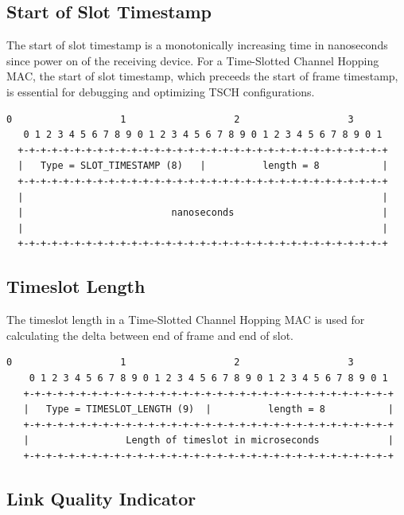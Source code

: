 \documentclass[12pt]{article}
\renewcommand\_{\textunderscore\allowbreak}
\begin{document}
\subsection{Start of Slot Timestamp}

The start of slot timestamp is a monotonically increasing time in nanoseconds
since power on of the receiving device.  For a Time-Slotted Channel Hopping
MAC, the start of slot timestamp, which preceeds the start of frame timestamp,
is essential for debugging and optimizing TSCH configurations.

\begin{Verbatim}[samepage=true]
   0                   1                   2                   3
   0 1 2 3 4 5 6 7 8 9 0 1 2 3 4 5 6 7 8 9 0 1 2 3 4 5 6 7 8 9 0 1
  +-+-+-+-+-+-+-+-+-+-+-+-+-+-+-+-+-+-+-+-+-+-+-+-+-+-+-+-+-+-+-+-+
  |   Type = SLOT_TIMESTAMP (8)   |          length = 8           |
  +-+-+-+-+-+-+-+-+-+-+-+-+-+-+-+-+-+-+-+-+-+-+-+-+-+-+-+-+-+-+-+-+
  |                                                               |
  |                          nanoseconds                          |
  |                                                               |
  +-+-+-+-+-+-+-+-+-+-+-+-+-+-+-+-+-+-+-+-+-+-+-+-+-+-+-+-+-+-+-+-+
\end{Verbatim}

\subsection{Timeslot Length}

The timeslot length in a Time-Slotted Channel Hopping MAC is used for
calculating the delta between end of frame and end of slot.

\begin{Verbatim}[samepage=true]
    0                   1                   2                   3
    0 1 2 3 4 5 6 7 8 9 0 1 2 3 4 5 6 7 8 9 0 1 2 3 4 5 6 7 8 9 0 1
   +-+-+-+-+-+-+-+-+-+-+-+-+-+-+-+-+-+-+-+-+-+-+-+-+-+-+-+-+-+-+-+-+
   |   Type = TIMESLOT_LENGTH (9)  |          length = 8           |
   +-+-+-+-+-+-+-+-+-+-+-+-+-+-+-+-+-+-+-+-+-+-+-+-+-+-+-+-+-+-+-+-+
   |                 Length of timeslot in microseconds            |
   +-+-+-+-+-+-+-+-+-+-+-+-+-+-+-+-+-+-+-+-+-+-+-+-+-+-+-+-+-+-+-+-+
\end{Verbatim}

\subsection{Link Quality Indicator}
\end{document}
